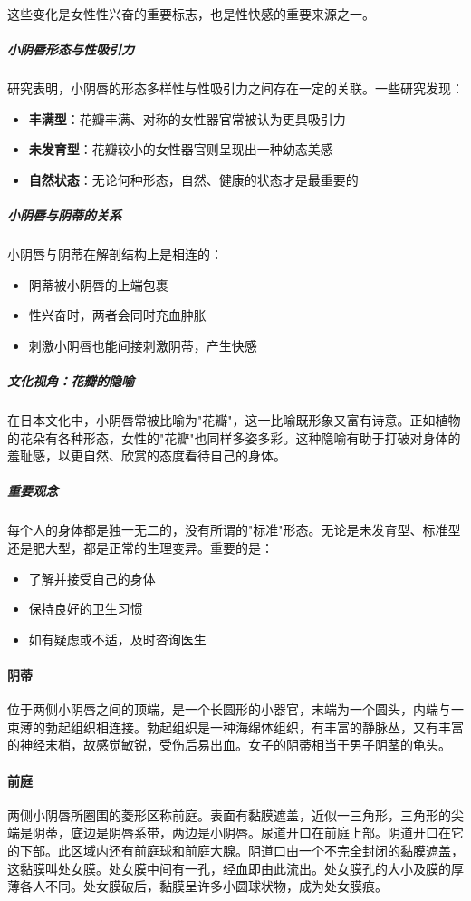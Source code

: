 \begin{enumerate}
这些变化是女性性兴奋的重要标志，也是性快感的重要来源之一。

\subparagraph{小阴唇形态与性吸引力}

研究表明，小阴唇的形态多样性与性吸引力之间存在一定的关联。一些研究发现：

\begin{itemize}
    \item \textbf{丰满型}：花瓣丰满、对称的女性器官常被认为更具吸引力
    \item \textbf{未发育型}：花瓣较小的女性器官则呈现出一种幼态美感
    \item \textbf{自然状态}：无论何种形态，自然、健康的状态才是最重要的
\end{itemize}

\subparagraph{小阴唇与阴蒂的关系}

小阴唇与阴蒂在解剖结构上是相连的：
\begin{itemize}
    \item 阴蒂被小阴唇的上端包裹
    \item 性兴奋时，两者会同时充血肿胀
    \item 刺激小阴唇也能间接刺激阴蒂，产生快感
\end{itemize}

\subparagraph{文化视角：花瓣的隐喻}

在日本文化中，小阴唇常被比喻为"花瓣"，这一比喻既形象又富有诗意。正如植物的花朵有各种形态，女性的"花瓣"也同样多姿多彩。这种隐喻有助于打破对身体的羞耻感，以更自然、欣赏的态度看待自己的身体。

\subparagraph{重要观念}

每个人的身体都是独一无二的，没有所谓的"标准"形态。无论是未发育型、标准型还是肥大型，都是正常的生理变异。重要的是：
\begin{itemize}
    \item 了解并接受自己的身体
    \item 保持良好的卫生习惯
    \item 如有疑虑或不适，及时咨询医生
\end{itemize}

\paragraph{阴蒂}
位于两侧小阴唇之间的顶端，是一个长圆形的小器官，末端为一个圆头，内端与一束薄的勃起组织相连接。勃起组织是一种海绵体组织，有丰富的静脉丛，又有丰富的神经末梢，故感觉敏锐，受伤后易出血。女子的阴蒂相当于男子阴茎的龟头。

\paragraph{前庭}
两侧小阴唇所圈围的菱形区称前庭。表面有黏膜遮盖，近似一三角形，三角形的尖端是阴蒂，底边是阴唇系带，两边是小阴唇。尿道开口在前庭上部。阴道开口在它的下部。此区域内还有前庭球和前庭大腺。阴道口由一个不完全封闭的黏膜遮盖，这黏膜叫处女膜。处女膜中间有一孔，经血即由此流出。处女膜孔的大小及膜的厚薄各人不同。处女膜破后，黏膜呈许多小圆球状物，成为处女膜痕。


\end{enumerate}
